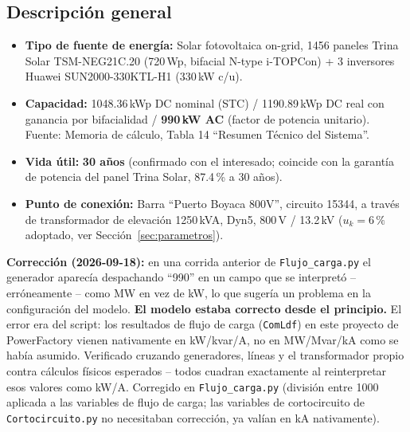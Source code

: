 \documentclass[11pt,a4paper]{article}
\begin{document}
\subsection*{Descripci\'on general}
\begin{itemize}
    \item \textbf{Tipo de fuente de energ\'ia:} Solar fotovoltaica on-grid, 1456 paneles Trina Solar TSM-NEG21C.20 (720\,Wp, bifacial N-type i-TOPCon) + 3 inversores Huawei SUN2000-330KTL-H1 (330\,kW c/u).
    \item \textbf{Capacidad:} 1048.36\,kWp DC nominal (STC) / 1190.89\,kWp DC real con ganancia por bifacialidad / \textbf{990\,kW AC} (factor de potencia unitario). Fuente: Memoria de c\'alculo, Tabla 14 ``Resumen T\'ecnico del Sistema''.
    \item \textbf{Vida \'util:} \textbf{30 a\~nos} (confirmado con el interesado; coincide con la garant\'ia de potencia del panel Trina Solar, 87.4\,\% a 30 a\~nos).
    \item \textbf{Punto de conexi\'on:} Barra ``Puerto Boyaca 800V'', circuito 15344, a trav\'es de transformador de elevaci\'on 1250\,kVA, Dyn5, 800\,V / 13.2\,kV ($u_k = 6\,\%$ adoptado, ver Secci\'on~\ref{sec:parametros}).
\end{itemize}

\textbf{Correcci\'on (2026-09-18):} en una corrida anterior de \texttt{Flujo\_carga.py} el generador aparec\'ia despachando ``990'' en un campo que se interpret\'o -- err\'oneamente -- como MW en vez de kW, lo que suger\'ia un problema en la configuraci\'on del modelo. \textbf{El modelo estaba correcto desde el principio.} El error era del script: los resultados de flujo de carga (\texttt{ComLdf}) en este proyecto de PowerFactory vienen nativamente en kW/kvar/A, no en MW/Mvar/kA como se hab\'ia asumido. Verificado cruzando generadores, l\'ineas y el transformador propio contra c\'alculos f\'isicos esperados -- todos cuadran exactamente al reinterpretar esos valores como kW/A. Corregido en \texttt{Flujo\_carga.py} (divisi\'on entre 1000 aplicada a las variables de flujo de carga; las variables de cortocircuito de \texttt{Cortocircuito.py} no necesitaban correcci\'on, ya val\'ian en kA nativamente).
\end{document}
